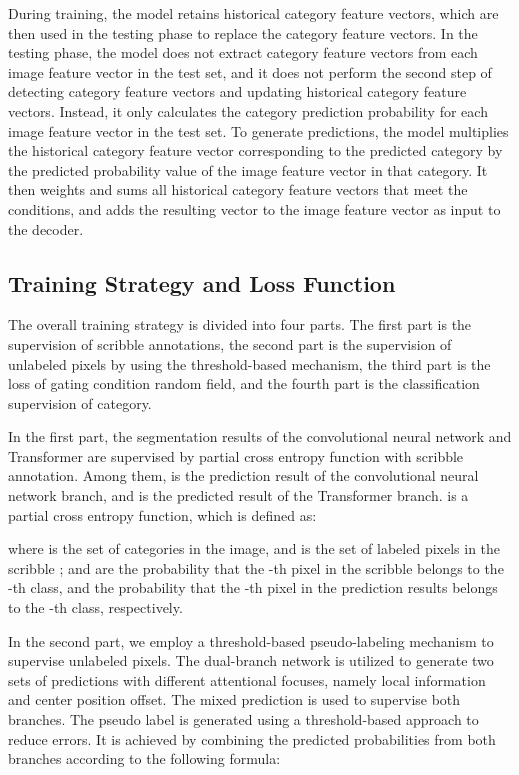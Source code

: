 \documentclass[sigconf,natbib=false]{acmart}
\begin{document}
During training, the model retains historical category feature vectors, which are then used in the testing phase to replace the category feature vectors. In the testing phase, the model does not extract category feature vectors from each image feature vector in the test set, and it does not perform the second step of detecting category feature vectors and updating historical category feature vectors. Instead, it only calculates the category prediction probability for each image feature vector in the test set.
To generate predictions, the model multiplies the historical category feature vector corresponding to the predicted category by the predicted probability value of the image feature vector in that category. It then weights and sums all historical category feature vectors that meet the conditions, and adds the resulting vector to the image feature vector as input to the decoder.
\vspace{-2mm}
\subsection{Training Strategy and Loss Function}
The overall training strategy is divided into four parts. The first part is the supervision of scribble annotations, the second part is the supervision of unlabeled pixels by using the threshold-based mechanism, the third part is the loss of gating condition random field, and the fourth part is the classification supervision of category.

In the first part, the segmentation results of the convolutional neural network and Transformer are supervised by partial cross entropy function  with scribble annotation. Among them, is the prediction result of the convolutional neural network branch, and is the predicted result of the Transformer branch. is a partial cross entropy function, which is defined as:

where  is the set of categories in the image, and is the set of labeled pixels in the scribble ;  and  are the probability that the -th pixel in the scribble belongs to the -th class, and the probability that the -th pixel in the prediction results belongs to the -th class, respectively.

In the second part, we employ a threshold-based pseudo-labeling mechanism to supervise unlabeled pixels. The dual-branch network is utilized to generate two sets of predictions with different attentional focuses, namely local information and center position offset. The mixed prediction is used to supervise both branches. The pseudo label  is generated using a threshold-based approach to reduce errors. It is achieved by combining the predicted probabilities from both branches according to the following formula:
\end{document}
